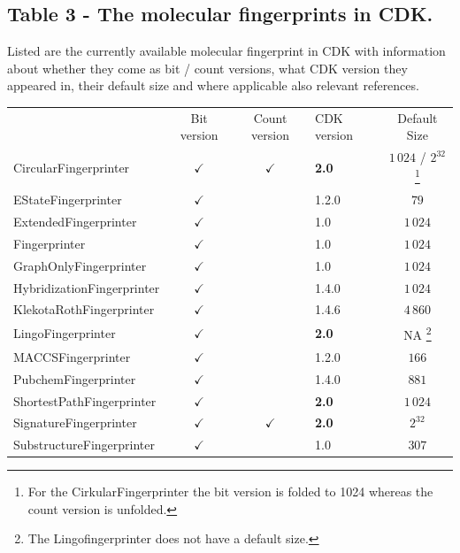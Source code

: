 \documentclass[10pt]{bmcart}
\def \cdkversion {\textbf{2.0}}
\begin{document}
\begin{backmatter}
  \subsection*{Table 3 - The molecular fingerprints in CDK.}
  \label{tab:fingerprints}
  Listed are the currently available molecular fingerprint in CDK with
  information about whether they come as bit / count versions, what CDK version
  they appeared in, their default size and where applicable also relevant
  references.
  \baselineskip

    \begin{minipage}{1\textwidth}
    \renewcommand*{\thempfootnote}{\fnsymbol{mpfootnote}}
    \centering
    \begin{tabular}{lcclc}
                             & Bit version  & Count version & CDK version & Default Size    \\
  CircularFingerprinter~\cite{rogers2010extended, Clark2014}      & $\checkmark$ & $\checkmark$  & \cdkversion{}     & $1\,024$ / $2^{32}$%
\footnote[1]{For the CirkularFingerprinter the bit version is folded to 1024 whereas the count version is unfolded.} \\
  EStateFingerprinter~\cite{Hall1995}       & $\checkmark$ &               & 1.2.0       & $79$            \\
  ExtendedFingerprinter      & $\checkmark$ &               & 1.0         & $1\,024$        \\
  Fingerprinter              & $\checkmark$ &               & 1.0         & $1\,024$        \\
  GraphOnlyFingerprinter     & $\checkmark$ &               & 1.0         & $1\,024$        \\
  HybridizationFingerprinter & $\checkmark$ &               & 1.4.0       & $1\,024$        \\
  KlekotaRothFingerprinter~\cite{Klekota2008}   & $\checkmark$ &               & 1.4.6       & $4\,860$        \\
  LingoFingerprinter~\cite{vidal2005lingo}         & $\checkmark$ &               & \cdkversion{}     & NA%
\footnote[2]{The Lingofingerprinter does not have a default size.}
                                                                                             \\
  MACCSFingerprinter         & $\checkmark$ &               & 1.2.0       & $166$           \\
  PubchemFingerprinter~\cite{pubchemFP}       & $\checkmark$ &               & 1.4.0       & $881$            \\
  ShortestPathFingerprinter  & $\checkmark$ &               & \cdkversion{}     & $1\,024$        \\
  SignatureFingerprinter~\cite{signaturefingerprints}     & $\checkmark$ & $\checkmark$  & \cdkversion{}     & $2^{32}$         \\
  SubstructureFingerprinter  & $\checkmark$ &               & 1.0         & $307$           \\


\end{tabular}
\end{minipage}
\end{backmatter}
\end{document}
